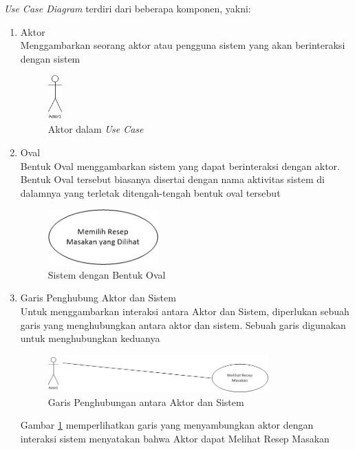 		\vspace{1cm}
		
		\textit{Use Case Diagram} terdiri dari beberapa komponen, yakni:
		\begin{enumerate}
			\item Aktor\\ 
			Menggambarkan seorang aktor atau pengguna sistem yang akan berinteraksi dengan sistem
			\begin{figure}[H]
				\centering
				\includegraphics[width=0.05\textwidth]{gambar/use-case/aktor}
				\caption{Aktor dalam \textit{Use Case}}
			\end{figure}
			\item Oval\\ 
			Bentuk Oval menggambarkan sistem yang dapat berinteraksi dengan aktor. Bentuk Oval tersebut biasanya disertai dengan nama aktivitas sistem di dalamnya yang terletak ditengah-tengah bentuk oval tersebut
			\begin{figure}[H]
				\centering
				\includegraphics[width=0.4\textwidth]{gambar/use-case/balon}
				\caption{Sistem dengan Bentuk Oval}
			\end{figure}
		
			\item Garis Penghubung Aktor dan Sistem\\ 
			Untuk menggambarkan interaksi antara Aktor dan Sistem, diperlukan sebuah garis yang menghubungkan antara aktor dan sistem. Sebuah garis digunakan untuk menghubungkan keduanya
			\begin{figure}[H]
				\centering
				\includegraphics[width=0.8\textwidth]{gambar/use-case/penghubung_aktor_sistem}
				\caption{Garis Penghubungan antara Aktor dan Sistem}
				\label{garis_aktor_sistem}
			\end{figure}
			Gambar \ref{garis_aktor_sistem} memperlihatkan garis yang menyambungkan aktor dengan interaksi sistem menyatakan bahwa Aktor dapat Melihat Resep Masakan
			

\end{enumerate}
